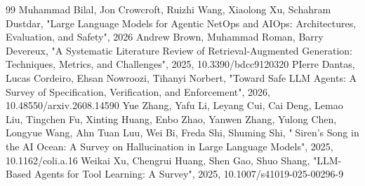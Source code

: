 \documentclass[conference]{IEEEtran}
\begin{document}
\begin{thebibliography}{99}
 Muhammad Bilal, Jon Crowcroft, Ruizhi Wang, Xiaolong Xu, Schahram Dustdar, "Large Language Models for Agentic NetOps and AIOps: Architectures, Evaluation, and Safety", 2026
 Andrew Brown, Muhammad Roman, Barry Devereux, "A Systematic Literature Review of Retrieval-Augmented Generation: Techniques, Metrics, and Challenges", 2025, 10.3390/bdcc9120320
 PIerre Dantas, Lucas Cordeiro, Ehsan Nowroozi, Tihanyi Norbert, "Toward Safe LLM Agents: A Survey of Specification, Verification, and Enforcement", 2026, 10.48550/arxiv.2608.14590
 Yue Zhang, Yafu Li, Leyang Cui, Cai Deng, Lemao Liu, Tingchen Fu, Xinting Huang, Enbo Zhao, Yanwen Zhang, Yulong Chen, Longyue Wang, Ahn Tuan Luu, Wei Bi, Freda Shi, Shuming Shi, "🧜Siren's Song in the AI Ocean: A Survey on Hallucination in Large Language Models", 2025, 10.1162/coli.a.16
 Weikai Xu, Chengrui Huang, Shen Gao, Shuo Shang, "LLM-Based Agents for Tool Learning: A Survey", 2025, 10.1007/s41019-025-00296-9
\end{thebibliography}
\end{document}
